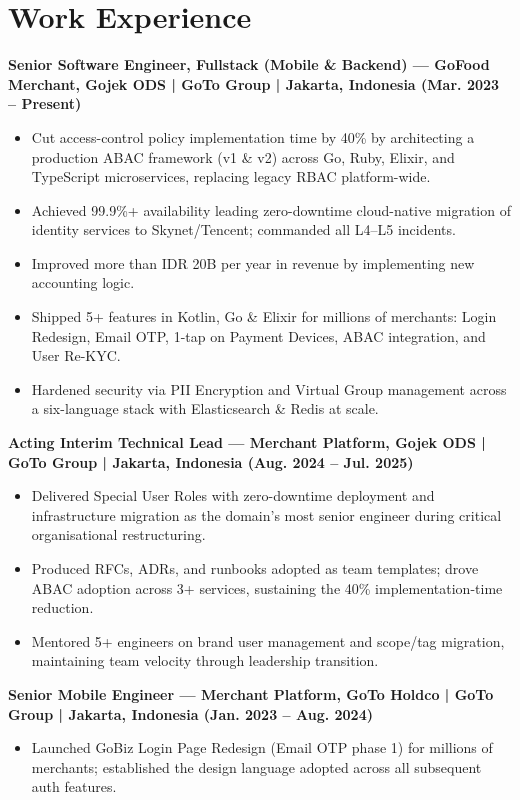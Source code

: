 \documentclass[10pt]{article}
\begin{document}
\section*{Work Experience}
\textbf{Senior Software Engineer, Fullstack (Mobile \& Backend) --- GoFood Merchant, Gojek ODS | GoTo Group | Jakarta, Indonesia (Mar. 2023 -- Present)}
\begin{itemize}
\item Cut access-control policy implementation time by 40\% by architecting a production ABAC framework (v1 \& v2) across Go, Ruby, Elixir, and TypeScript microservices, replacing legacy RBAC platform-wide.
\item Achieved 99.9\%+ availability leading zero-downtime cloud-native migration of identity services to Skynet/Tencent; commanded all L4--L5 incidents.
\item Improved more than IDR 20B per year in revenue by implementing new accounting logic.
\item Shipped 5+ features in Kotlin, Go \& Elixir for millions of merchants: Login Redesign, Email OTP, 1-tap on Payment Devices, ABAC integration, and User Re-KYC.
\item Hardened security via PII Encryption and Virtual Group management across a six-language stack with Elasticsearch \& Redis at scale.
\end{itemize}
 
\textbf{Acting Interim Technical Lead --- Merchant Platform, Gojek ODS | GoTo Group | Jakarta, Indonesia (Aug. 2024 -- Jul. 2025)}
\begin{itemize}
\item Delivered Special User Roles with zero-downtime deployment and infrastructure migration as the domain's most senior engineer during critical organisational restructuring.
\item Produced RFCs, ADRs, and runbooks adopted as team templates; drove ABAC adoption across 3+ services, sustaining the 40\% implementation-time reduction.
\item Mentored 5+ engineers on brand user management and scope/tag migration, maintaining team velocity through leadership transition.
\end{itemize}
 
\textbf{Senior Mobile Engineer --- Merchant Platform, GoTo Holdco | GoTo Group | Jakarta, Indonesia (Jan. 2023 -- Aug. 2024)}
\begin{itemize}
\item Launched GoBiz Login Page Redesign (Email OTP phase 1) for millions of merchants; established the design language adopted across all subsequent auth features.
\end{itemize}
 
\end{document}
